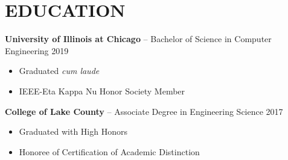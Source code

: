\documentclass[11pt,letterpaper]{article}
\newcommand{\subheading}[3]{
    \textbf{#1}{ #2 }{\hfill #3 \vspace{-2pt}}
}
\begin{document}
\section*{EDUCATION}
\subheading{University of Illinois at Chicago}{-- Bachelor of Science in Computer Engineering}{2019} \\
\vspace{-8pt}
\begin{itemize}
  \item Graduated \textit{cum laude}
  \item IEEE-Eta Kappa Nu Honor Society Member \\ %
\end{itemize}
\vspace{-10pt}
\subheading{College of Lake County}{-- Associate Degree in Engineering Science}{2017 } \\
\vspace{-8pt}
\begin{itemize}
  \item Graduated with High Honors
  \item Honoree of Certification of Academic Distinction
\end{itemize}
\vspace{-10pt}
\end{document}
